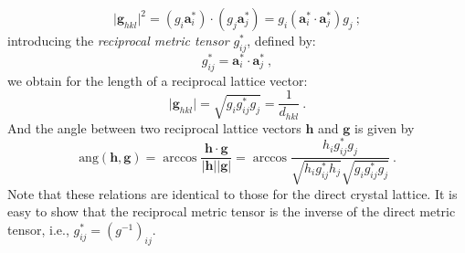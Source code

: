 \[
	\vert\mathbf{g}_{hkl}\vert^2 = (g_i\mathbf{a}^{\ast}_i)\cdot(g_j\mathbf{a}^{\ast}_j) = 
	g_i (\mathbf{a}^{\ast}_i\cdot\mathbf{a}^{\ast}_j) g_j \ ;
\]
introducing the \textit{reciprocal metric tensor} $g^{\ast}_{ij}$, defined by:
\begin{equation}
	g^{\ast}_{ij} = \mathbf{a}^{\ast}_i\cdot\mathbf{a}^{\ast}_j \ ,
\end{equation}
we obtain for the length of a reciprocal lattice vector:
\begin{equation}
	\vert\mathbf{g}_{hkl}\vert = \sqrt{g_i g^{\ast}_{ij}g_j} = \frac{1}{d_{hkl}} \ .\label{\chabbr:eq:recipddef}
\end{equation}
And the angle between two reciprocal lattice  vectors $\mathbf{h}$ and $\mathbf{g}$ is given by
\begin{equation}
	\text{ang}(\mathbf{h},\mathbf{g}) = \arccos\frac{\mathbf{h}\cdot\mathbf{g}}{\vert\mathbf{h}\vert\vert\mathbf{g}\vert} =
	\arccos\frac{h_i g^{\ast}_{ij}g_j}{\sqrt{h_i g^{\ast}_{ij}h_j}\sqrt{g_i g^{\ast}_{ij}g_j}}\ .\label{\chabbr:eq:recipangledef}
\end{equation}
Note that these relations are identical to those for the direct crystal lattice.  It is easy to show that the reciprocal metric tensor is the inverse of the direct metric tensor, i.e., $g^{\ast}_{ij} = (g^{-1})_{ij}$.

